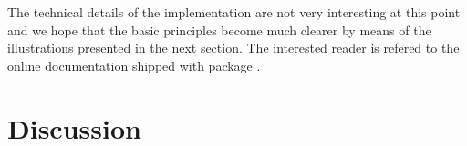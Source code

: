 \documentclass[12pt]{article}
\begin{document}
The technical details of the implementation are not very interesting
at this point and we hope that the basic principles become much
clearer by means of the illustrations presented in the next section.
The interested reader is refered to the online documentation shipped
with package .





\section{Discussion}



\end{document}
